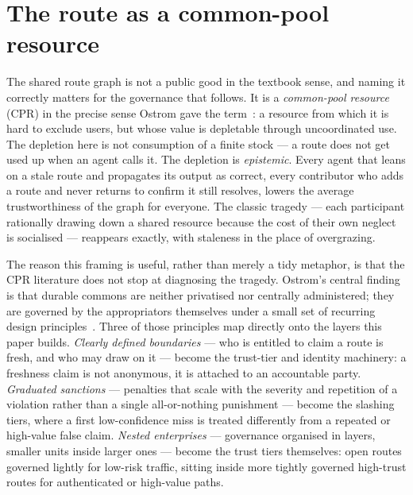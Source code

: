\documentclass[11pt]{article}
\begin{document}
\section{The route as a common-pool resource}

The shared route graph is not a public good in the textbook sense, and naming it
correctly matters for the governance that follows. It is a \emph{common-pool
resource} (CPR) in the precise sense Ostrom gave the term~\cite{ostrom}: a
resource from which it is hard to exclude users, but whose value is depletable
through uncoordinated use. The depletion here is not consumption of a finite
stock --- a route does not get used up when an agent calls it. The depletion is
\emph{epistemic}. Every agent that leans on a stale route and propagates its
output as correct, every contributor who adds a route and never returns to
confirm it still resolves, lowers the average trustworthiness of the graph for
everyone. The classic tragedy --- each participant rationally drawing down a
shared resource because the cost of their own neglect is socialised --- reappears
exactly, with staleness in the place of overgrazing.

The reason this framing is useful, rather than merely a tidy metaphor, is that
the CPR literature does not stop at diagnosing the tragedy. Ostrom's central
finding is that durable commons are neither privatised nor centrally
administered; they are governed by the appropriators themselves under a small set
of recurring design principles~\cite{ostrom}. Three of those principles map
directly onto the layers this paper builds. \emph{Clearly defined boundaries} ---
who is entitled to claim a route is fresh, and who may draw on it --- become the
trust-tier and identity machinery: a freshness claim is not anonymous, it is
attached to an accountable party. \emph{Graduated sanctions} --- penalties that
scale with the severity and repetition of a violation rather than a single
all-or-nothing punishment --- become the slashing tiers, where a first
low-confidence miss is treated differently from a repeated or high-value false
claim. \emph{Nested enterprises} --- governance organised in layers, smaller
units inside larger ones --- become the trust tiers themselves: open routes
governed lightly for low-risk traffic, sitting inside more tightly governed
high-trust routes for authenticated or high-value paths.
\end{document}
